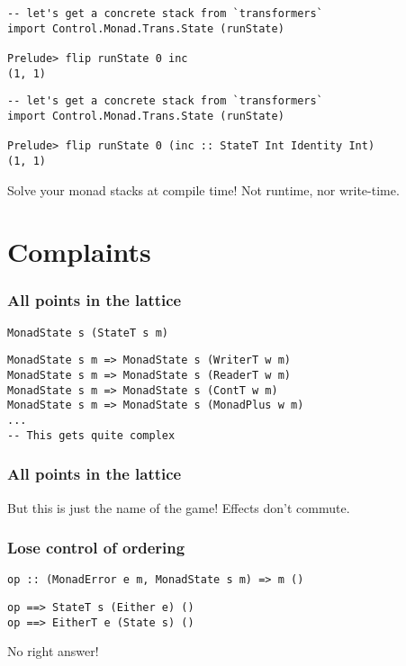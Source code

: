 \documentclass[pdf]{beamer}
\begin{document}
\begin{frame}[fragile]
\begin{lstlisting}
-- let's get a concrete stack from `transformers`
import Control.Monad.Trans.State (runState)

Prelude> flip runState 0 inc 
(1, 1)
\end{lstlisting}
\end{frame}

\begin{frame}[fragile]
\begin{lstlisting}
-- let's get a concrete stack from `transformers`
import Control.Monad.Trans.State (runState)

Prelude> flip runState 0 (inc :: StateT Int Identity Int)
(1, 1)
\end{lstlisting}
\end{frame}

\begin{frame}
  Solve your monad stacks at compile time! \pause Not runtime\pause, nor write-time.
\end{frame}

\section{Complaints}

\begin{frame}
  \frametitle{All points in the lattice}
\begin{lstlisting}
MonadState s (StateT s m)
\end{lstlisting}
  \pause
\begin{lstlisting}
MonadState s m => MonadState s (WriterT w m)
MonadState s m => MonadState s (ReaderT w m)
MonadState s m => MonadState s (ContT w m)
MonadState s m => MonadState s (MonadPlus w m)
...
-- This gets quite complex
\end{lstlisting}
\end{frame}

\begin{frame}
  \frametitle{All points in the lattice}
  But this is just the name of the game! Effects don't commute.
\end{frame}

\begin{frame}
  \frametitle{Lose control of ordering}
\begin{lstlisting}
op :: (MonadError e m, MonadState s m) => m ()
\end{lstlisting}
  \pause
\begin{lstlisting}
op ==> StateT s (Either e) ()
op ==> EitherT e (State s) ()
\end{lstlisting}
  \pause
No right answer!
\end{frame}
\end{document}
